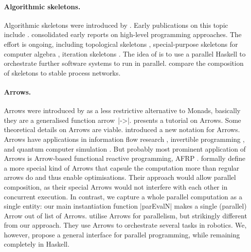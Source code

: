 \paragraph{Algorithmic skeletons.}
Algorithmic skeletons were introduced by \citet{Cole1989}.
Early publications on this topic include \cite{darlington1993parallel,botorog1996efficient,p3l97,Gorlatch1998,Lengauer1997}. \citet{SkeletonBook} consolidated early reports on high-level programming approaches.
The effort is ongoing, including topological skeletons \cite{Eden:PARCO05}, special-purpose skeletons for computer algebra \cite{Berthold2009-fft,lobachev-phd,Lobachev2012,janjic2013space}, iteration skeletons \cite{Dieterle2013}. The idea of \citet{scscp} is to use a parallel Haskell to orchestrate further software systems to run in parallel. \citet{dieterle_horstmeyer_loogen_berthold_2016} compare the composition of skeletons to stable process networks.

\paragraph{Arrows.}
Arrows were introduced by \citet{HughesArrows} as a less restrictive alternative to Monads, basically they are a generalised function arrow~|->|. \citet{Hughes2005} presents a tutorial on Arrows. Some theoretical details on Arrows \cite{jacobs_heunen_hasuo_2009,LINDLEY201197,ATKEY201119} are viable. \citet{Paterson:2001:NNA:507669.507664} introduced a new notation for Arrows. Arrows have applications in information flow research \cite{1648705,LI20101974,Russo:2008:LLI:1411286.1411289}, invertible programming \cite{Alimarine:2005:BAA:1088348.1088357}, and quantum computer simulation \cite{vizzotto_altenkirch_sabry_2006}. But probably most prominent application of Arrows is Arrow-based functional reactive programming, AFRP \cite{Nilsson:2002:FRP:581690.581695,Hudak2003,Czaplicki:2013:AFR:2499370.2462161}.
\citet{Liu:2009:CCA:1631687.1596559} formally define a more special kind of Arrows that capsule the computation more than regular arrows do and thus enable optimisations. Their approach would allow parallel composition, as their special Arrows would not interfere with each other in concurrent execution. In contrast, we capture a whole parallel computation as a single entity: our main instantiation function |parEvalN| makes a single (parallel) Arrow out of list of Arrows. \citet{Huang2007} utilise Arrows for parallelism, but strikingly different from our approach. They use Arrows to orchestrate several tasks in robotics. We, however, propose a general interface for parallel programming, while remaining completely in Haskell.

